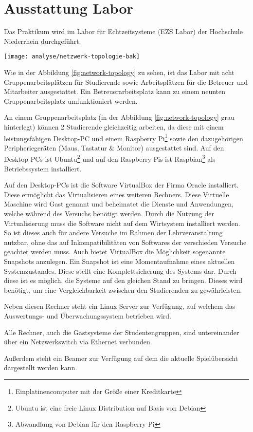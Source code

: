 \section{Ausstattung Labor}
\label{sec:Ausstattung_Labor}

Das Praktikum wird im Labor für Echtzeitsysteme (EZS Labor) der Hochschule Niederrhein durchgeführt.

\begin{center}
	\texttt{[image: analyse/netzwerk-topologie-bak]}
	\label{fig:network-topology}
\end{center}

Wie in der Abbildung \ref{fig:network-topology} zu sehen, ist das Labor mit acht Gruppenarbeitsplätzen für Studierende sowie Arbeitsplätzen für die Betreuer und Mitarbeiter ausgestattet. Ein Betreuerarbeitsplatz kann zu einem neunten Gruppenarbeitsplatz umfunktioniert werden.

An einem Gruppenarbeitsplatz (in der Abbildung \ref{fig:network-topology} grau hinterlegt) können 2 Studierende gleichzeitig arbeiten, da diese mit einem leistungsfähigen Desktop-PC und einem Raspberry Pi\footnote{Einplatinencomputer mit der Größe einer Kreditkarte} sowie den dazugehörigen Peripheriegeräten (Maus, Tastatur \& Monitor) ausgestattet sind.
Auf den Desktop-PCs ist Ubuntu\footnote{Ubuntu ist eine freie Linux Distribution auf Basis von Debian} und auf den Raspberry Pis ist Raspbian\footnote{Abwandlung von Debian für den Raspberry Pi} als Betriebssystem installiert.

Auf den Desktop-PCs ist die Software VirtualBox der Firma Oracle installiert. Diese ermöglicht das Virtualisieren eines weiteren Rechners. Diese Virtuelle Maschine wird Gast genannt und beheimatet die Dienste und Anwendungen, welche während des Versuchs benötigt werden. Durch die Nutzung der Virtualisierung muss die Software nicht auf dem Wirtsystem installiert werden. So ist dieses auch für andere Versuche im Rahmen der Lehrveranstaltung nutzbar, ohne das auf Inkompatibilitäten von Softwares der verschieden Versuche geachtet werden muss. Auch bietet VirtualBox die Möglichkeit sogenannte Snapshots anzulegen. Ein Snapshot ist eine Momentaufnahme eines aktuellen Systemzustandes. Diese stellt eine Komplettsicherung des Systems dar. Durch diese ist es möglich, die Systeme auf den gleichen Stand zu bringen. Dieses wird benötigt, um eine Vergleichbarkeit zwischen den Studierenden zu gewährleisten.\cite{OracleVMVirtualBox}

Neben diesen Rechner steht ein Linux Server zur Verfügung, auf welchem das Auswertungs- und Überwachungssystem betrieben wird.

Alle Rechner, auch die Gastsysteme der Studentengruppen, sind untereinander über ein Netzwerkswitch via Ethernet verbunden.

Außerdem steht ein Beamer zur Verfügung auf dem die aktuelle Spielübersicht dargestellt werden kann.